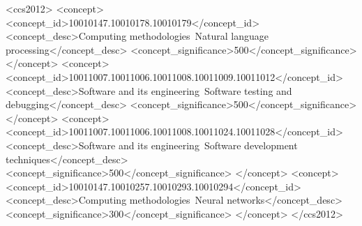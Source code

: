 \begin{abstract}
Code generation has emerged as one of AI's highest-impact use cases, yet existing benchmarks measure isolated tasks rather than the complete "zero-to-one" process of building a working application from scratch. We introduce \textbf{Vibe Code Bench}, a benchmark of 100 web application specifications (50 public validation, 50 held-out test) with 964 browser-based workflows comprising 10,131 substeps, evaluated against deployed applications by an autonomous browser agent.

Across 16 frontier models, the best achieves 61.8\% accuracy on the test split, revealing that reliable end-to-end application development remains a frontier challenge. We identify self-testing during generation as a strong performance predictor (Pearson r=0.72), and show through a completed human alignment study that evaluator selection materially affects outcomes (31.8–93.6\% pairwise step-level agreement).

Our contributions include (1) a novel benchmark dataset and browser-based evaluation pipeline for end-to-end web application development, (2) a comprehensive evaluation of 16 frontier models with cost, latency, and error analysis, and (3) an evaluator alignment protocol with both cross-model and human annotation results.

We provide reproducibility artifacts, detailed in Appendix \ref{sec:appendix-artifacts}.
\end{abstract}


\begin{CCSXML}
<ccs2012>
   <concept>
       <concept_id>10010147.10010178.10010179</concept_id>
       <concept_desc>Computing methodologies~Natural language processing</concept_desc>
       <concept_significance>500</concept_significance>
   </concept>
   <concept>
       <concept_id>10011007.10011006.10011008.10011009.10011012</concept_id>
       <concept_desc>Software and its engineering~Software testing and debugging</concept_desc>
       <concept_significance>500</concept_significance>
   </concept>
   <concept>
       <concept_id>10011007.10011006.10011008.10011024.10011028</concept_id>
       <concept_desc>Software and its engineering~Software development techniques</concept_desc>
       <concept_significance>500</concept_significance>
   </concept>
   <concept>
       <concept_id>10010147.10010257.10010293.10010294</concept_id>
       <concept_desc>Computing methodologies~Neural networks</concept_desc>
       <concept_significance>300</concept_significance>
   </concept>
</ccs2012>
\end{CCSXML}

